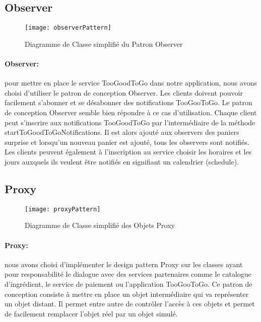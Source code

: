 \subsection{Observer}

\begin{figure}[!ht]
\texttt{[image: observerPattern]}
\centering
\caption{Diagramme de Classe simplifié du Patron Observer}
\label{uml:observer}
\end{figure}


\paragraph{Observer: } pour mettre en place le service TooGoodToGo dans notre application,
nous avons choisi d'utiliser le patron de conception Observer. Les clients doivent pouvoir facilement 
s'abonner et se désabonner des notifications TooGooToGo.
Le patron de conception Observer semble bien répondre à ce cas d'utilisation. 
Chaque client peut s'inscrire aux notifications TooGoodToGo par l'intermédiaire 
de la méthode startToGoodToGoNotifications. Il est alors ajouté aux observers des paniers 
surprise et lorsqu'un nouveau panier est ajouté, tous les observers sont notifiés.
Les clients peuvent également à l'inscription au service choisir les horaires et les 
jours auxquels ils veulent être notifiés en signifiant un calendrier (schedule).


\subsection{Proxy}

\begin{figure}[!ht]
\texttt{[image: proxyPattern]}
\centering
\caption{Diagramme de Classe simplifié des Objets Proxy}
\label{uml:proxy}
\end{figure}

\paragraph{Proxy: } nous avons choisi d'implémenter le design pattern Proxy sur les classes
ayant pour responsabilité le dialogue avec des services partenaires comme le catalogue d'ingrédient,
le service de paiement ou l'application TooGooToGo. 
Ce patron de conception consiste à mettre en place un objet intermédiaire qui va représenter un objet distant.
Il permet entre autre de contrôler l'accès à ces objets et permet de facilement remplacer l'objet réel par un objet simulé.

